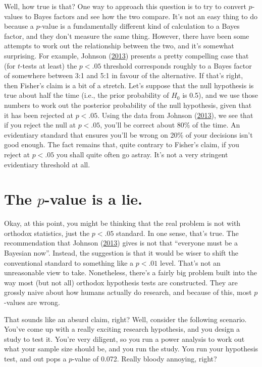 \documentclass[
]{book}
\theoremstyle{definition}
\theoremstyle{definition}
\theoremstyle{definition}
\theoremstyle{definition}
\theoremstyle{remark}
\begin{document}
Well, how true is that? One way to approach this question is to try to convert \(p\)-values to Bayes factors and see how the two compare. It's not an easy thing to do because a \(p\)-value is a fundamentally different kind of calculation to a Bayes factor, and they don't measure the same thing. However, there have been some attempts to work out the relationship between the two, and it's somewhat surprising. For example, Johnson (\protect\hyperlink{ref-Johnson2013}{2013}) presents a pretty compelling case that (for \(t\)-tests at least) the \(p<.05\) threshold corresponds roughly to a Bayes factor of somewhere between 3:1 and 5:1 in favour of the alternative. If that's right, then Fisher's claim is a bit of a stretch. Let's suppose that the null hypothesis is true about half the time (i.e., the prior probability of \(H_0\) is 0.5), and we use those numbers to work out the posterior probability of the null hypothesis, given that it has been rejected at \(p<.05\). Using the data from Johnson (\protect\hyperlink{ref-Johnson2013}{2013}), we see that if you reject the null at \(p<.05\), you'll be correct about 80\% of the time. An evidentiary standard that ensures you'll be wrong on 20\% of your decisions isn't good enough. The fact remains that, quite contrary to Fisher's claim, if you reject at \(p<.05\) you shall quite often go astray. It's not a very stringent evidentiary threshold at all.

\hypertarget{the-p-value-is-a-lie.}{%
\section{\texorpdfstring{The \(p\)-value is a lie.}{The p-value is a lie.}}\label{the-p-value-is-a-lie.}}

Okay, at this point, you might be thinking that the real problem is not with orthodox statistics, just the \(p<.05\) standard. In one sense, that's true. The recommendation that Johnson (\protect\hyperlink{ref-Johnson2013}{2013}) gives is not that ``everyone must be a Bayesian now''. Instead, the suggestion is that it would be wiser to shift the conventional standard to something like a \(p<.01\) level. That's not an unreasonable view to take. Nonetheless, there's a fairly big problem built into the way most (but not all) orthodox hypothesis tests are constructed. They are grossly naive about how humans actually do research, and because of this, most \(p\)-values are wrong.

That sounds like an absurd claim, right? Well, consider the following scenario. You've come up with a really exciting research hypothesis, and you design a study to test it. You're very diligent, so you run a power analysis to work out what your sample size should be, and you run the study. You run your hypothesis test, and out pops a \(p\)-value of 0.072. Really bloody annoying, right?
\end{document}
